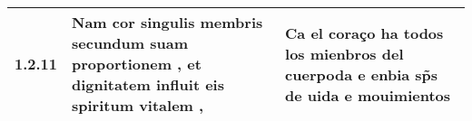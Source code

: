 \begin{tabular}{|p{1cm}|p{6.5cm}|p{6.5cm}|}

\hline
1.2.11 & Nam cor singulis membris \textbf{ secundum suam proportionem , } et dignitatem influit eis spiritum vitalem , & Ca el coraço ha todos los mienbros del \textbf{ cuerpoda } e enbia sp̃s de uida e mouimientos \\\hline

\end{tabular}
